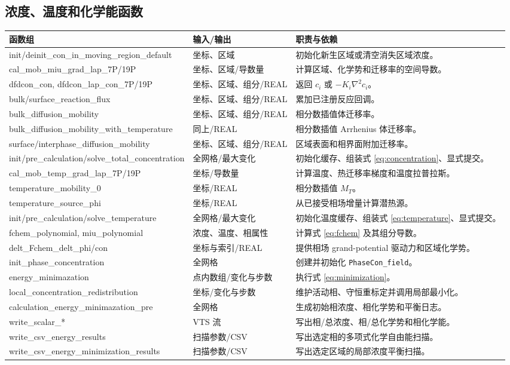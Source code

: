 \documentclass[UTF8,a4paper,11pt]{ctexart}
\newcommand{\code}[1]{\texttt{#1}}
\begin{document}
\subsection{浓度、温度和化学能函数}

\begin{longtable}{>{\ttfamily}p{}p{}p{}}
\toprule
\normalfont 函数组 & 输入/输出 & 职责与依赖\\
\midrule
\endhead
init/deinit\_con\_in\_moving\_region\_default & 坐标、区域 & 初始化新生区域或清空消失区域浓度。\\
cal\_mob\_miu\_grad\_lap\_7P/19P & 坐标、区域/导数量 & 计算区域、化学势和迁移率的空间导数。\\
dfdcon\_con, dfdcon\_lap\_con\_7P/19P & 坐标、区域、组分/REAL & 返回 $c_i$ 或 $-K_i\nabla^2c_i$。\\
bulk/surface\_reaction\_flux & 坐标、区域、组分/REAL & 累加已注册反应回调。\\
bulk\_diffusion\_mobility & 坐标、区域、组分/REAL & 相分数插值体迁移率。\\
bulk\_diffusion\_mobility\_with\_temperature & 同上/REAL & 相分数插值 Arrhenius 体迁移率。\\
surface/interphase\_diffusion\_mobility & 坐标、区域、组分/REAL & 区域表面和相界面附加迁移率。\\
init/pre\_calculation/solve\_total\_concentration & 全网格/最大变化 & 初始化缓存、组装式 \eqref{eq:concentration}、显式提交。\\
cal\_mob\_temp\_grad\_lap\_7P/19P & 坐标/导数量 & 计算温度、热迁移率梯度和温度拉普拉斯。\\
temperature\_mobility\_0 & 坐标/REAL & 相分数插值 $M_T$。\\
temperature\_source\_phi & 坐标/REAL & 从已接受相场增量计算潜热源。\\
init/pre\_calculation/solve\_temperature & 全网格/最大变化 & 初始化温度缓存、组装式 \eqref{eq:temperature}、显式提交。\\
fchem\_polynomial, miu\_polynomial & 浓度、温度、相属性 & 计算式 \eqref{eq:fchem} 及其组分导数。\\
delt\_Fchem\_delt\_phi/con & 坐标与索引/REAL & 提供相场 grand-potential 驱动力和区域化学势。\\
init\_phase\_concentration & 全网格 & 创建并初始化 \code{PhaseCon\_field}。\\
energy\_minimazation & 点内数组/变化与步数 & 执行式 \eqref{eq:minimization}。\\
local\_concentration\_redistribution & 坐标/变化与步数 & 维护活动相、守恒重标定并调用局部最小化。\\
calculation\_energy\_minimazation\_pre & 全网格 & 生成初始相浓度、相化学势和平衡日志。\\
write\_scalar\_* & VTS 流 & 写出相/总浓度、相/总化学势和相化学能。\\
write\_csv\_energy\_results & 扫描参数/CSV & 写出选定相的多项式化学自由能扫描。\\
write\_csv\_energy\_minimization\_results & 扫描参数/CSV & 写出选定区域的局部浓度平衡扫描。\\
\bottomrule
\end{longtable}
\end{document}
